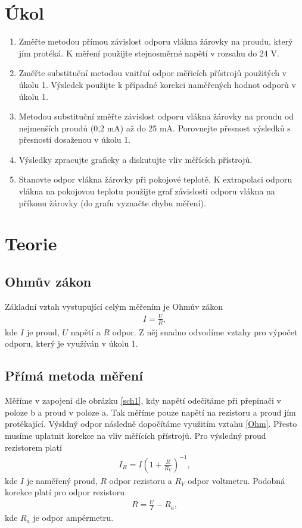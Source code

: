 \documentclass[a4paper,12pt]{article}
\begin{document}
\section{Úkol}
\noindent
\begin{enumerate}
    \item Změřte metodou přímou závislost odporu vlákna žárovky na proudu, který jím protéká. K měření použijte stejnosměrné napětí v rozsahu do 24 V.
    \item Změřte substituční metodou vnitřní odpor měřicích přístrojů použitých v úkolu 1. Výsledek použijte k případné korekci naměřených hodnot odporů v úkolu 1.
    \item Metodou substituční změřte závislost odporu vlákna žárovky na proudu od nejmenších proudů (0,2 mA) až do 25 mA. Porovnejte přesnost výsledků s přesností dosaženou v úkolu 1.
    \item Výsledky zpracujte graficky a diskutujte vliv měřících přístrojů.
    \item Stanovte odpor vlákna žárovky při pokojové teplotě. K extrapolaci odporu vlákna na pokojovou teplotu použijte graf závislosti odporu vlákna na příkonu žárovky (do grafu vyznačte chybu měření). 
\end{enumerate}

\section{Teorie}
\subsection{Ohmův zákon}
Základní vztah vystupující celým měřením je Ohmův zákon
\begin{eqnarray}
I=\frac{U}{R},
\label{Ohm}
\end{eqnarray}
kde $I$ je proud, $U$ napětí a $R$ odpor. Z něj snadno odvodíme vztahy pro výpočet odporu, který je využíván v úkolu 1.

\subsection{Přímá metoda měření}
Měříme v zapojení dle obrázku \ref{sch1}, kdy napětí odečítáme při přepínači v poloze b a proud v poloze a. Tak měříme pouze napětí na rezistoru a proud jím protékající. Výsldný odpor 
následně dopočítáme využitím vztahu \ref{Ohm}. Přesto musíme uplatnit korekce na vliv měřících přístrojů. Pro výsledný proud rezistorem platí
\begin{eqnarray}
I_R=I(1+\frac{R}{R_V})^{-1},
\label{I_R}
\end{eqnarray}
kde $I$ je naměřený proud, $R$ odpor rezistoru a $R_V$ odpor voltmetru. Podobná korekce platí pro odpor rezistoru
\begin{eqnarray}
R=\frac{U}{I}-R_a,
\label{R}
\end{eqnarray}
kde $R_a$ je odpor ampérmetru.
\end{document}
